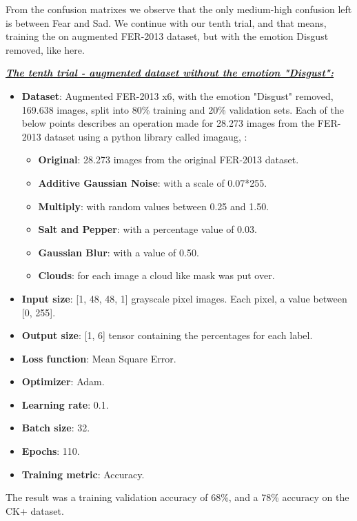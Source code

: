 \documentclass[runningheads,a4paper,11pt]{report}
\begin{document}
From the confusion matrixes we observe that the only medium-high confusion left is between Fear and Sad. We continue with our tenth trial, and that means, training the on augmented FER-2013 dataset, but with the emotion Disgust removed, like here.

\clearpage
\underline{\textbf{\emph{The tenth trial - augmented dataset without the emotion "Disgust":}}}
\begin{itemize}
	\item \textbf{Dataset}: Augmented FER-2013 x6, with the emotion "Disgust" removed, 169.638 images, split into 80\% training and 20\% validation sets. Each of the below points describes an operation made for 28.273 images from the FER-2013 dataset using a python library called imagaug, \cite{imgaug}:
	\begin{itemize}
		\item \textbf{Original}: 28.273 images from the original FER-2013 dataset.
		\item \textbf{Additive Gaussian Noise}: with a scale of 0.07*255.
		\item \textbf{Multiply}: with random values between 0.25 and 1.50.
		\item \textbf{Salt and Pepper}: with a percentage value of 0.03.
		\item \textbf{Gaussian Blur}: with a value of 0.50.
		\item \textbf{Clouds}: for each image a cloud like mask was put over.
	\end{itemize}
	\item \textbf{Input size}: [1, 48, 48, 1] grayscale pixel images. Each pixel, a value between [0, 255].
	\item \textbf{Output size}: [1, 6] tensor containing the percentages for each label.
	\item \textbf{Loss function}: Mean Square Error.
	\item \textbf{Optimizer}: Adam.
	\item \textbf{Learning rate}: 0.1.
	\item \textbf{Batch size}: 32.
	\item \textbf{Epochs}: 110.
	\item \textbf{Training metric}: Accuracy.
\end{itemize}
The result was a training validation accuracy of 68\%, and a 78\% accuracy on the CK+ dataset.
\end{document}
